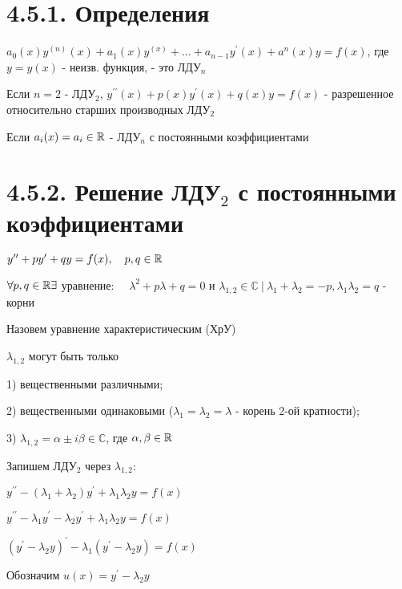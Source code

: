 \documentclass[12pt]{article}
\begin{document}
    \hypertarget{lineardifferentialequationhigherdegree}{}

    \section{4.5.1. Определения}

    \Def $a_0(x) y^{(n)}(x) + a_1(x)y^{(x)} + \dots + a_{n - 1}y^\prime(x) + a^n(x)y = f(x)$, где $y = y(x)$ - неизв. функция, - это ЛДУ$_n$

    \Nota Если $n = 2$ - ЛДУ$_2$, $y^{\prime\prime}(x) + p(x)y^\prime(x) + q(x)y = f(x)$ - разрешенное относительно старших производных ЛДУ$_2$

    \Nota Если $a_i(x) = a_i \in \mathbb{R}$ - ЛДУ$_n$ с постоянными коэффициентами

    \hypertarget{lineardifferentialequationseconddegreewithconstants}{}

    \section{4.5.2. Решение ЛДУ$_2$ с постоянными коэффициентами}

    $y^{\prime\prime} + p y^\prime + q y = f(x), \quad p, q \in \mathbb{R}$

    $\forall p, q \in \mathbb{R} \exists $ уравнение: $\quad \lambda^2 + p\lambda + q = 0$ и $\lambda_{1,2} \in \mathbb{C} \ | \ \lambda_1 + \lambda_2 = -p, \lambda_1 \lambda_2 = q$ - корни

    Назовем уравнение характеристическим (ХрУ) \Cat

    \Nota $\lambda_{1, 2}$ могут быть только

    1) вещественными различными;

    2) вещественными одинаковыми ($\lambda_1 = \lambda_2 = \lambda$ - корень 2-ой кратности);

    3) $\lambda_{1,2} = \alpha \pm i \beta \in \mathbb{C}$, где $\alpha, \beta \in \mathbb{R}$

    Запишем ЛДУ$_2$ через $\lambda_{1, 2}$:

    $y^{\prime\prime} - (\lambda_1 + \lambda_2) y^\prime + \lambda_1 \lambda_2 y = f(x)$

    $y^{\prime\prime} - \lambda_1 y^\prime - \lambda_2 y^\prime + \lambda_1 \lambda_2 y = f(x)$

    $(y^\prime - \lambda_2 y)^\prime - \lambda_1 (y^\prime - \lambda_2 y) = f(x)$

    Обозначим $u(x) = y^\prime - \lambda_2 y$
\end{document}
